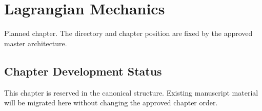 \chapter{Lagrangian Mechanics}
\label{chap:10-lagrangian-mechanics}

\begin{roadmapbox}
Planned chapter. The directory and chapter position are fixed by the approved master architecture.
\end{roadmapbox}

\section*{Chapter Development Status}
This chapter is reserved in the canonical structure. Existing manuscript material will be migrated here without changing the approved chapter order.
